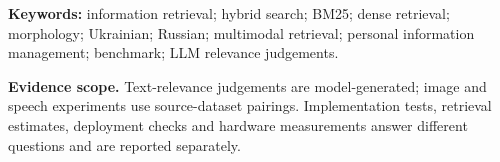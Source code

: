 \documentclass[11pt]{article}
\begin{document}
\noindent\textbf{Keywords:} information retrieval; hybrid search; BM25; dense retrieval; morphology; Ukrainian; Russian; multimodal retrieval; personal information management; benchmark; LLM relevance judgements.

\medskip
\noindent\textbf{Evidence scope.} Text-relevance judgements are model-generated; image and speech experiments use source-dataset pairings. Implementation tests, retrieval estimates, deployment checks and hardware measurements answer different questions and are reported separately.







\clearpage

\clearpage








\appendix

\clearpage

\end{document}
